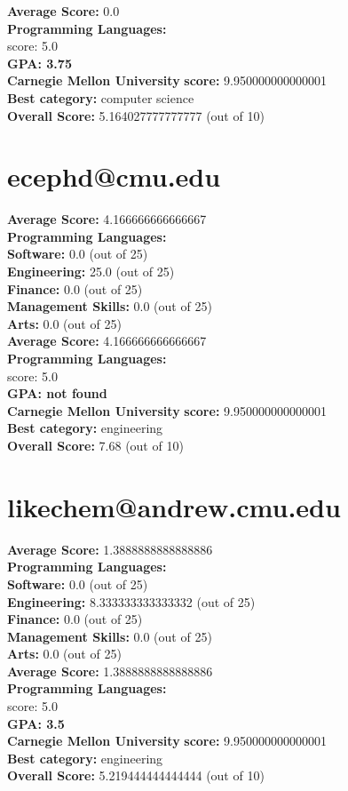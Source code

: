 \documentclass{article}
\begin{document}
\textbf{Average Score: } 0.0\\
\textbf{Programming Languages:} \\
score: 5.0\\
\textbf{GPA: 3.75}\\
\textbf{Carnegie Mellon University} \textbf{score:} 9.950000000000001\\
\textbf{Best category: } computer science\\
    \textbf{Overall Score: }5.164027777777777 (out of 10)\section{ecephd@cmu.edu}
\textbf{Average Score: } 4.166666666666667\\
\textbf{Programming Languages:} \\
\textbf{Software:} 0.0 (out of 25)\\
    \textbf{Engineering: } 25.0 (out of 25)\\
    \textbf{Finance:} 0.0 (out of 25)\\
    \textbf{Management Skills:} 0.0 (out of 25)\\
    \textbf{Arts:} 0.0 (out of 25)\\
\textbf{Average Score: } 4.166666666666667\\
\textbf{Programming Languages:} \\
score: 5.0\\
\textbf{GPA: not found}\\
\textbf{Carnegie Mellon University} \textbf{score:} 9.950000000000001\\
\textbf{Best category: } engineering\\
    \textbf{Overall Score: }7.68 (out of 10)\section{likechem@andrew.cmu.edu}
\textbf{Average Score: } 1.3888888888888886\\
\textbf{Programming Languages:} \\
\textbf{Software:} 0.0 (out of 25)\\
    \textbf{Engineering: } 8.333333333333332 (out of 25)\\
    \textbf{Finance:} 0.0 (out of 25)\\
    \textbf{Management Skills:} 0.0 (out of 25)\\
    \textbf{Arts:} 0.0 (out of 25)\\
\textbf{Average Score: } 1.3888888888888886\\
\textbf{Programming Languages:} \\
score: 5.0\\
\textbf{GPA: 3.5}\\
\textbf{Carnegie Mellon University} \textbf{score:} 9.950000000000001\\
\textbf{Best category: } engineering\\
    \textbf{Overall Score: }5.219444444444444 (out of 10)
\end{document}
